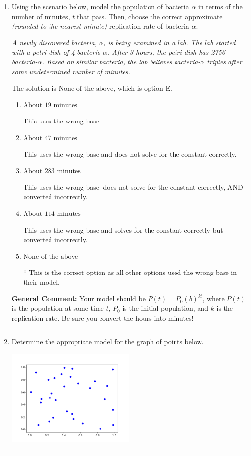 \documentclass{extbook}[14pt]
\newcommand{\litem}[1]{\item #1

\rule{\textwidth}{0.4pt}}
\begin{document}
\begin{enumerate}\litem{
Using the scenario below, model the population of bacteria $\alpha$ in terms of the number of minutes, $t$ that pass. Then, choose the correct approximate \textit{(rounded to the nearest minute)} replication rate of bacteria-$\alpha$.

\begin{center}
    \textit{ A newly discovered bacteria, $\alpha$, is being examined in a lab. The lab started with a petri dish of 4 bacteria-$\alpha$. After 3 hours, the petri dish has 2756 bacteria-$\alpha$. Based on similar bacteria, the lab believes bacteria-$\alpha$ triples after some undetermined number of minutes. }
\end{center}


The solution is \( \text{None of the above} \), which is option E.\begin{enumerate}[label=\Alph*.]
\item \( \text{About } 19 \text{ minutes} \)

This uses the wrong base.
\item \( \text{About } 47 \text{ minutes} \)

This uses the wrong base and does not solve for the constant correctly.
\item \( \text{About } 283 \text{ minutes} \)

This uses the wrong base, does not solve for the constant correctly, AND converted incorrectly.
\item \( \text{About } 114 \text{ minutes} \)

This uses the wrong base and solves for the constant correctly but converted incorrectly.
\item \( \text{None of the above} \)

* This is the correct option as all other options used the wrong base in their model.
\end{enumerate}

\textbf{General Comment:} Your model should be $P(t) = P_0(b)^{kt}$, where $P(t)$ is the population at some time $t$, $P_0$ is the initial population, and $k$ is the replication rate. Be sure you convert the hours into minutes!
}
\litem{
Determine the appropriate model for the graph of points below.

\begin{center}
    \includegraphics[width=0.5\textwidth]{../Figures/identifyModelGraph11CopyB.png}
\end{center}




}
\end{enumerate}
\end{document}
